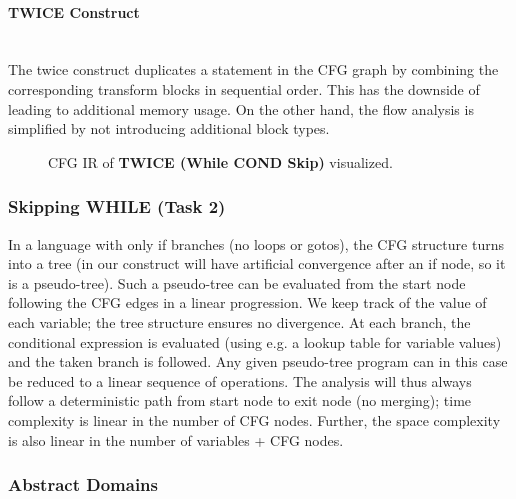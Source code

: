 \documentclass[a4paper]{article}
\newcommand{\NL}[0]{ \hfill\\\noindent }
\begin{document}
\paragraph{TWICE Construct}\NL
The twice construct duplicates a statement in the CFG graph by combining the corresponding transform blocks in sequential order. This has the downside of leading to additional memory usage. On the other hand, the flow analysis is simplified by not introducing additional block types.

\begin{figure}[ht!]
	\centering	
	\scalebox{.6}{}
	\caption{ CFG IR of \textbf{TWICE (While COND Skip)} visualized. }
	\label{twiceflow}
\end{figure}

%

\subsubsection{Skipping WHILE (Task 2)}
In a language with only if branches (no loops or gotos), the CFG structure turns into a tree (in our construct will have artificial convergence after an if node, so it is a pseudo-tree). Such a pseudo-tree can be evaluated from the start node following the CFG edges in a linear progression. We keep track of the value of each variable; the tree structure ensures no divergence. At each branch, the conditional expression is evaluated (using e.g. a lookup table for variable values) and the taken branch is followed. Any given pseudo-tree program can in this case be reduced to a linear sequence of operations. The analysis will thus always follow a deterministic path from start node to exit node (no merging); time complexity is linear in the number of CFG nodes. Further, the space complexity is also linear in the number of variables + CFG nodes.

\subsubsection{Abstract Domains}
\end{document}

